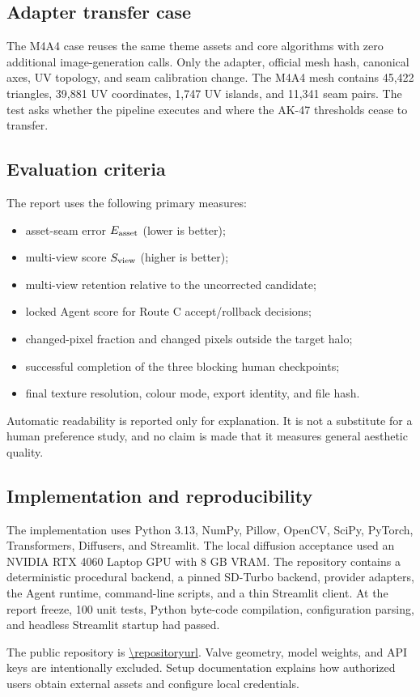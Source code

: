 \subsection{Adapter transfer case}

The M4A4 case reuses the same theme assets and core algorithms with zero additional
image-generation calls. Only the adapter, official mesh hash, canonical axes, UV
topology, and seam calibration change. The M4A4 mesh contains 45,422 triangles,
39,881 UV coordinates, 1,747 UV islands, and 11,341 seam pairs. The test asks
whether the pipeline executes and where the AK-47 thresholds cease to transfer.

\subsection{Evaluation criteria}

The report uses the following primary measures:

\begin{itemize}
  \item asset-seam error $E_{\mathrm{asset}}$ (lower is better);
  \item multi-view score $S_{\mathrm{view}}$ (higher is better);
  \item multi-view retention relative to the uncorrected candidate;
  \item locked Agent score for Route C accept/rollback decisions;
  \item changed-pixel fraction and changed pixels outside the target halo;
  \item successful completion of the three blocking human checkpoints;
  \item final texture resolution, colour mode, export identity, and file hash.
\end{itemize}

Automatic readability is reported only for explanation. It is not a substitute
for a human preference study, and no claim is made that it measures general
aesthetic quality.

\subsection{Implementation and reproducibility}

The implementation uses Python 3.13, NumPy, Pillow, OpenCV, SciPy, PyTorch,
Transformers, Diffusers, and Streamlit. The local diffusion acceptance used an
NVIDIA RTX 4060 Laptop GPU with 8 GB VRAM. The repository contains a deterministic
procedural backend, a pinned SD-Turbo backend, provider adapters, the Agent
runtime, command-line scripts, and a thin Streamlit client. At the report freeze,
100 unit tests, Python byte-code compilation, configuration parsing, and headless
Streamlit startup had passed.

The public repository is \url{\repositoryurl}. Valve geometry, model weights, and
API keys are intentionally excluded. Setup documentation explains how authorized
users obtain external assets and configure local credentials.
